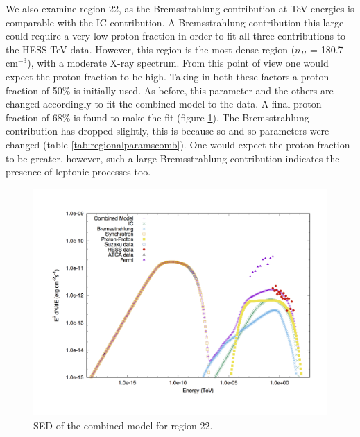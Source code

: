 \documentclass[12pt,a4paper]{article}
\begin{document}
We also examine region 22, as the Bremsstrahlung contribution at TeV energies is comparable with the IC contribution. A Bremsstrahlung contribution this large could require a very low proton fraction in order to fit all three contributions to the HESS TeV data. However, this region is the most dense region ($n_H$ = 180.7 cm$^{-3}$), with a moderate X-ray spectrum. From this point of view one would expect the proton fraction to be high. Taking in both these factors a proton fraction of 50\% is initially used. As before, this parameter and the others are changed accordingly to fit the combined model to the data. A final proton fraction of 68\% is found to make the fit (figure \ref{fig:rxj1713comb22}). The Bremsstrahlung contribution has dropped slightly, this is because so and so parameters were changed (table \ref{tab:regionalparamscomb}). One would expect the proton fraction to be greater, however, such a large Bremsstrahlung contribution indicates the presence of leptonic processes too. 
\begin{figure}[H]
	\centering
	\includegraphics[width=0.4\linewidth, height=0.3\textheight, angle=-90]{rxj1713_comb22}
	\caption{SED of the combined model for region 22.}
	\label{fig:rxj1713comb22}
\end{figure}
\end{document}
